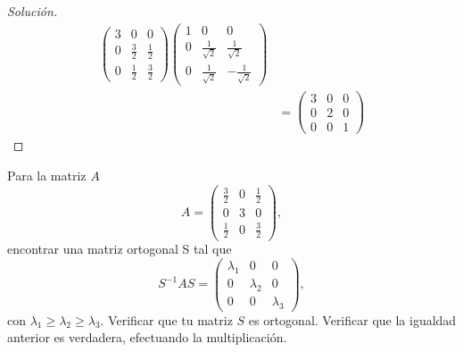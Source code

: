 \documentclass[12pt]{book}
\newenvironment{solucion}
  {\renewcommand\qedsymbol{$\square$}\begin{proof}[Solución]}
  {\end{proof}}
\begin{document}
\begin{solucion}
\begin{align*}
\begin{pmatrix}
        3 & 0 & 0\\
        0 & \frac{3}{2} & \frac{1}{2}\\
        0 & \frac{1}{2} & \frac{3}{2}
    \end{pmatrix}\begin{pmatrix}
        1 & 0 & 0\\
        0 & \frac{1}{\sqrt{2}} & \frac{1}{\sqrt{2}}\\
        0 & \frac{1}{\sqrt{2}} & -\frac{1}{\sqrt{2}}
    \end{pmatrix}\\
    &=\begin{pmatrix}
        3 & 0 & 0\\
        0 & 2 & 0\\
        0 & 0 & 1
    \end{pmatrix}
\end{align*}
\end{solucion}

\eje Para la matriz $A$
    \[
        A=\begin{pmatrix}
            \frac{3}{2} & 0 & \frac{1}{2}\\
            0 & 3 & 0 \\
            \frac{1}{2} & 0 & \frac{3}{2}
        \end{pmatrix},
    \]
encontrar una matriz ortogonal S tal que
    \[
        S^{-1}AS=\begin{pmatrix}
            \lambda_1 & 0 & 0 \\
            0 & \lambda_2 & 0 \\
            0 & 0 & \lambda_3
        \end{pmatrix},
    \]
con $\lambda_1\geq\lambda_2\geq\lambda_3$. Verificar que tu matriz $S$ es ortogonal. Verificar que la igualdad anterior es verdadera, efectuando la multiplicación.
\end{document}
